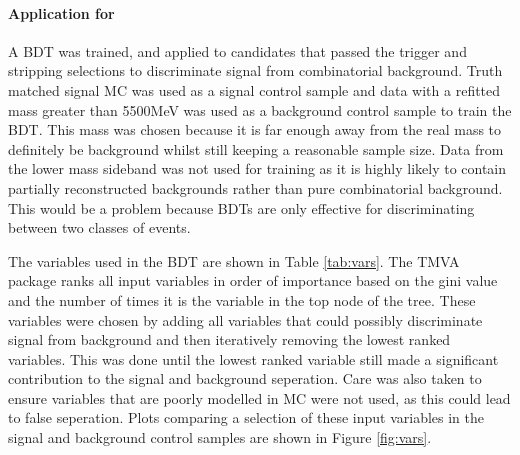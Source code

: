 \paragraph{Application for \Bd \to \Kstar \etaz}
A BDT was trained, and applied to candidates that passed the trigger and stripping selections to discriminate signal from combinatorial background.  Truth matched signal MC was used as a signal control sample and data with a refitted \Bd mass greater than 5500MeV was used as a background control sample to train the BDT.  This mass was chosen because it is far enough away from the real \Bd mass to definitely be background whilst still keeping a reasonable sample size.  Data from the lower mass sideband was not used for training as it is highly likely to contain partially reconstructed backgrounds rather than pure combinatorial background.  This would be a problem because BDTs are only effective for discriminating between two classes of events.

The variables used in the BDT are shown in Table \ref{tab:vars}.  The TMVA package ranks all input variables in order of importance based on the gini value and the number of times it is the variable in the top node of the tree.  These variables were chosen by adding all variables that could possibly discriminate signal from background and then iteratively removing the lowest ranked variables.  This was done until the lowest ranked variable still made a significant contribution to the signal and background seperation.  Care was also taken to ensure variables that are poorly modelled in MC were not used, as this could lead to false seperation.  Plots comparing a selection of these input variables in the signal and background control samples are shown in Figure \ref{fig:vars}.

